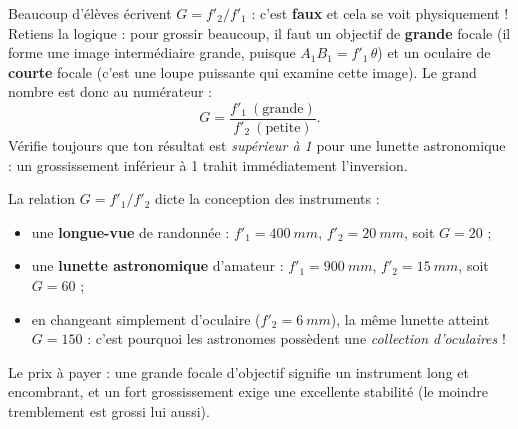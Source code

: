 \documentclass[11pt]{article}
\begin{document}
\begin{attention}
Beaucoup d'élèves écrivent $G = f'_2/f'_1$ : c'est \textbf{faux} et cela se voit physiquement ! Retiens la logique : pour grossir beaucoup, il faut un objectif de \textbf{grande} focale (il forme une image intermédiaire grande, puisque $A_1B_1 = f'_1\,\theta$) et un oculaire de \textbf{courte} focale (c'est une loupe puissante qui examine cette image). Le grand nombre est donc au numérateur :
\[
G = \dfrac{f'_1 \ (\text{grande})}{f'_2 \ (\text{petite})}.
\]
Vérifie toujours que ton résultat est \emph{supérieur à 1} pour une lunette astronomique : un grossissement inférieur à 1 trahit immédiatement l'inversion.
\end{attention}

\begin{exemplebox}
La relation $G = f'_1/f'_2$ dicte la conception des instruments :
\begin{itemize}
\item une \textbf{longue-vue} de randonnée : $f'_1 = \SI{400}{mm}$, $f'_2 = \SI{20}{mm}$, soit $G = 20$ ;
\item une \textbf{lunette astronomique} d'amateur : $f'_1 = \SI{900}{mm}$, $f'_2 = \SI{15}{mm}$, soit $G = 60$ ;
\item en changeant simplement d'oculaire ($f'_2 = \SI{6}{mm}$), la même lunette atteint $G = 150$ : c'est pourquoi les astronomes possèdent une \emph{collection d'oculaires} !
\end{itemize}
Le prix à payer : une grande focale d'objectif signifie un instrument long et encombrant, et un fort grossissement exige une excellente stabilité (le moindre tremblement est grossi lui aussi).
\end{exemplebox}
\end{document}
